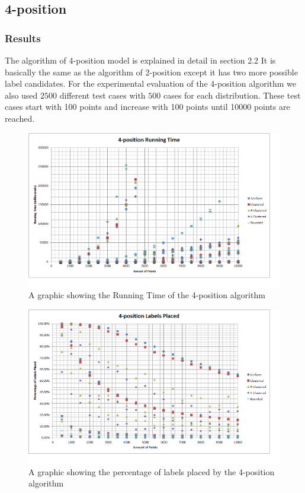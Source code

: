 \documentclass[crop=false,a4paper,oneside,11pt]{standalone}
\begin{document}
\subsection{4-position}
\subsubsection{Results}
The algorithm of 4-position model is explained in detail in section 2.2 It is basically the same as the algorithm of 2-position except it has two more possible label candidates. For the experimental evaluation of the 4-position algorithm we also used $2500$ different test cases with $500$ cases for each distribution. These test cases start with 100 points and increase with 100 points until 10000 points are reached.\\

 \begin{figure}[h!]
 \centering
 \centerline{\includegraphics[scale = 0.65]{4PosRunningTime.png}}
 \caption{A graphic showing the Running Time of the 4-position algorithm}
 \end{figure}

 \begin{figure}[h!]
 \centering
  \centerline{\includegraphics[scale = 0.65]{4PosLabelsPlaced.png}}
  \caption{A graphic showing the percentage of labels placed by the 4-position algorithm}
 \end{figure}
\end{document}
